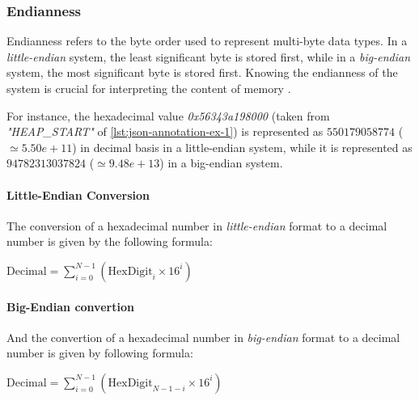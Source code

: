     \subsubsection{Endianness}
    
    Endianness refers to the byte order used to represent multi-byte data types. In a \textit{little-endian} system, the least significant byte is stored first, while in a \textit{big-endian} system, the most significant byte is stored first. Knowing the endianness of the system is crucial for interpreting the content of memory \cite{InferenceEndianness17}.
    
    For instance, the hexadecimal value \textit{0x56343a198000} (taken from \textit{"HEAP\_START"} of \ref{lst:json-annotation-ex-1}) is represented as $550179058774$ ($\simeq 5.50e+11$) in decimal basis in a little-endian system, while it is represented as $94782313037824$ ($\simeq 9.48e+13$) in a big-endian system.

    \begin{minipage}{\dimexpr\linewidth-20pt}
        \paragraph{Little-Endian Conversion}
        The conversion of a hexadecimal number in \textit{little-endian} format to a decimal number is given by the following formula:
        \par %
        
        \vspace{2em}  %
        \begin{center}
            $
            \text{Decimal} = \sum_{i=0}^{N-1} \left( \text{HexDigit}_{i} \times 16^{i} \right)
            $
        \end{center}
        \vspace{1em}
    \end{minipage}
    
    \begin{minipage}{\dimexpr\linewidth-20pt}
        \paragraph{Big-Endian convertion}
        And the convertion of a hexadecimal number in \textit{big-endian} format to a decimal number is given by following formula:
        \par %
        
        \vspace{2em}  %
        \begin{center}
            $
            \text{Decimal} = \sum_{i=0}^{N-1} \left( \text{HexDigit}_{N-1-i} \times 16^{i} \right)
            $
        \end{center}
        \vspace{1em}
    \end{minipage}

